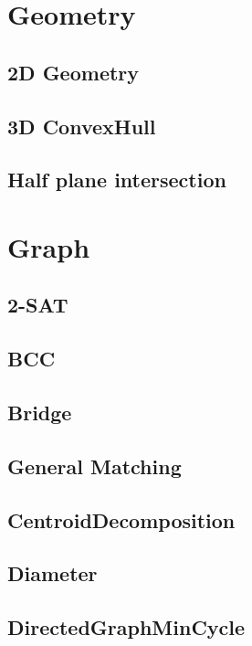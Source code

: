 \section{Geometry}
\subsection{2D Geometry}

\subsection{3D ConvexHull}

\subsection{Half plane intersection}



\section{Graph}
\subsection{2-SAT}

\subsection{BCC}

\subsection{Bridge}

\subsection{General Matching}

\subsection{CentroidDecomposition}

\subsection{Diameter}

\subsection{DirectedGraphMinCycle}

